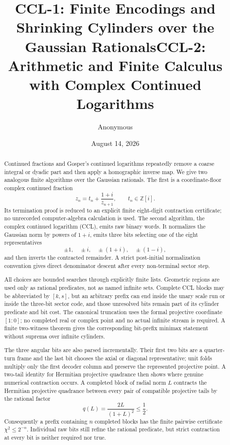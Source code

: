 \documentclass[10pt]{article}
\title{CCL-1: Finite Encodings and Shrinking Cylinders over the Gaussian Rationals}
\title{CCL-2: Arithmetic and Finite Calculus with Complex Continued Logarithms}
\author{Anonymous}
\date{August 14, 2026}
\theoremstyle{definition}
\theoremstyle{remark}
\newcommand{\Zi}{\mathbb{Z}[i]}
\begin{document}
\maketitle

\begin{abstract}
\ifCCLone
Continued fractions and Gosper's continued logarithms repeatedly remove a coarse integral or dyadic part and then apply a homographic inverse map.  We give two analogous finite algorithms over the Gaussian rationals.  The first is a coordinate-floor complex continued fraction
\[
 z_n=t_n+\frac{1+i}{z_{n+1}},\qquad t_n\in\Zi.
\]
Its termination proof is reduced to an explicit finite eight-digit contraction certificate; no unrecorded computer-algebra calculation is used.  The second algorithm, the complex continued logarithm (CCL), emits raw binary words.  It normalizes the Gaussian norm by powers of $1+i$, emits three bits selecting one of the eight representatives
\[
 \pm1,\quad \pm i,\quad \pm(1+i),\quad \pm(1-i),
\]
and then inverts the contracted remainder.  A strict post-initial normalization convention gives direct denominator descent after every non-terminal sector step.

All choices are bounded searches through explicitly finite lists.  Geometric regions are used only as rational predicates, not as named infinite sets.  Complete CCL blocks may be abbreviated by $[k,s]$, but an arbitrary prefix can end inside the unary scale run or inside the three-bit sector code, and those unresolved bits remain part of its cylinder predicate and bit cost.  The canonical truncation uses the formal projective coordinate $[1:0]$; no completed real or complex point and no actual infinite stream is required.  A finite two-witness theorem gives the corresponding bit-prefix minimax statement without suprema over infinite cylinders.

The three angular bits are also parsed incrementally.  Their first two bits are a quarter-turn frame and the last bit chooses the axial or diagonal representative; unit folds multiply only the first decoder column and preserve the represented projective point.  A two-tail identity for Hermitian projective quadrance then shows where genuine numerical contraction occurs.  A completed block of radial norm $L$ contracts the Hermitian projective quadrance between every pair of compatible projective tails by the rational factor
\[
 q(L)=\frac{2L}{(1+L)^2}\le\frac12.
\]
Consequently a prefix containing $n$ completed blocks has the finite pairwise certificate $\chi^2\le2^{-n}$.  Individual raw bits still refine the rational predicate, but strict contraction at every bit is neither required nor true.


\end{abstract}
\end{document}
